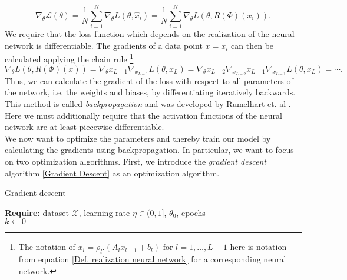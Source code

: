 \documentclass[11pt,titlepage]{article}
\theoremstyle{definition}
\theoremstyle{remark}
\begin{document}
	\[\nabla_\theta \mathcal{L}(\theta) = \frac{1}{N} \sum_{i=1}^N \nabla_\theta L(\theta, \hat{x}_i) = \frac{1}{N} \sum_{i=1}^N \nabla_\theta L(\theta, R(\Phi)(x_i)).\]
	We require that the loss function which depends on the realization of the neural network is differentiable. The gradients of a data point $x = x_i$ can then be calculated applying the chain rule \footnote{The notation of $x_l = \rho_l.(A_l x_{l-1} + b_l)$ for $l=1,\ldots, L-1$ here is notation from equation \ref{Def. realization neural network} for a corresponding neural network.}
	\[ \nabla_\theta L(\theta, R(\Phi)(x)) = \nabla_\theta x_{L-1} \nabla_{x_{L-1}} L(\theta,x_L) = \nabla_\theta x_{L-2} \nabla_{x_{L-2}} x_{L-1} \nabla_{x_{L-1}}L(\theta, x_L) = \cdots .\]%
	Thus, we can calculate the gradient of the loss with respect to all parameters of the network, i.e. the weights and biases, by differentiating iteratively backwards. This method is called \textsl{backpropagation} and was developed by Rumelhart et. al \cite{Rumelhart1986}.
	Here we must additionally require that the activation functions of the neural network are at least piecewise differentiable. \\
	We now want to optimize the parameters and thereby train our model by calculating the gradients using backpropagation. 
	In particular, we want to focus on two optimization algorithms. First, we introduce the \textsl{gradient descent} algorithm \ref{Gradient Descent} as an optimization algorithm.
	
	\begin{algorithm}
		\caption{Gradient descent} \label{Gradient Descent}
		\textbf{Require:} dataset $\mathcal{X}$, learning rate $\eta\in (0,1]$, $\theta_0$, epochs\\
		$k\gets 0$\\
	\end{algorithm}
	
\end{document}
